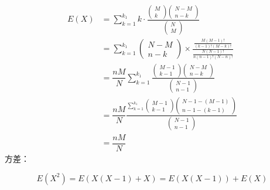 \documentclass[12pt, a4paper, oneside]{ctexbook}
\begin{document}
$$
\begin{aligned}
E(X) &= \sum\limits_{k = 1}^{k_1} k \cdot \frac{\begin{pmatrix} M \\ k\end{pmatrix} \begin{pmatrix} N - M \\ n - k\end{pmatrix}}{\begin{pmatrix} N \\ M\end{pmatrix}} \\
&= \sum\limits_{k = 1}^{k_1} \begin{pmatrix} N - M \\ n - k\end{pmatrix}\times \frac{\frac{M(M - 1)!}{(k - 1)!(M - k)!}}{\frac{N(N - 1)!}{n(n - 1)!(N-n)!}} \\
&= \dfrac{nM}{N}\sum\limits_{k = 1}^{k_1} \frac{\begin{pmatrix} M - 1 \\ k - 1\end{pmatrix}\begin{pmatrix}N - M \\ n - k \end{pmatrix} }{\begin{pmatrix} N - 1\\ n - 1\end{pmatrix}}\\
&= \dfrac{nM}{N} \frac{\sum\limits_{k = 1}^{k_1} \begin{pmatrix} M - 1 \\ k - 1\end{pmatrix}\begin{pmatrix}N - 1 - (M - 1) \\ n - 1 - (k - 1) \end{pmatrix}}{\begin{pmatrix} N - 1 \\ n - 1\end{pmatrix}} \\
&= \dfrac{nM}{N}
\end{aligned}
$$
 方差：

$$
E(X^{2})= E(X(X - 1) + X) = E(X(X - 1)) + E(X)
$$
\end{document}
